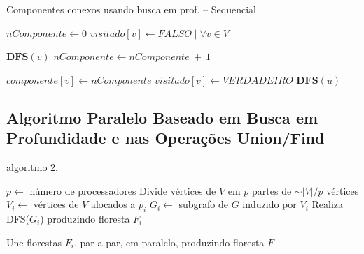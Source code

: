 \documentclass[12pt]{article}
\begin{document}
\begin{algorithm}
    \DontPrintSemicolon
    \caption{Componentes conexos usando busca em prof. -- Sequencial}
	{
        $nComponente \gets 0$\;
        $visitado[v] \gets FALSO \mid \forall v \in V$\;
    
        {
            {
                $\textbf{DFS}(v)$\;
                $nComponente \gets nComponente\ +\ 1$\;
            }
        }
    }
    
    {
        $componente[v] \gets nComponente$\; 
        $visitado[v] \gets VERDADEIRO$\;
        {
            {
                $\textbf{DFS}(u)$\;
            }
        }
    }
\end{algorithm}

\subsection{Algoritmo Paralelo Baseado em Busca em Profundidade e nas Operações Union/Find}

algoritmo 2.

\begin{algorithm}
    \DontPrintSemicolon
    {
        $p \gets$ número de processadores\;
        Divide vértices de $V$ em $p$ partes de $\sim|V|/p$ vértices\;
        {
            $V_i \gets$ vértices de $V$ alocados a $p_i$\;
            $G_i \gets$ subgrafo de $G$ induzido por $V_i$\;
            Realiza DFS($G_i$) produzindo floresta $F_i$\;
        }

        Une florestas $F_i$, par a par, em paralelo, produzindo floresta $F$\;
        
    }
\end{algorithm}
\end{document}
